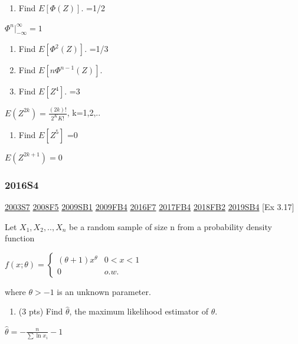 \documentclass[6pt,twocolumn,Portrait]{article}
\providecommand{\tightlist}{%
  \setlength{\itemsep}{0pt}\setlength{\parskip}{0pt}}
\begin{document}
\begin{enumerate}
\def\labelenumi{(\alph{enumi})}
\tightlist
\item
  Find \(E[\Phi(Z)]\). =1/2
\end{enumerate}

\(\Phi^n |_{-\infty}^{\infty}=1\)

\begin{enumerate}
\def\labelenumi{(\alph{enumi})}
\setcounter{enumi}{1}
\item
  Find \(E[\Phi^{2}(Z)]\). =1/3
\item
  Find \(E[n\Phi^{n-1}(Z)]\).
\item
  Find \(E[Z^4]\). =3
\end{enumerate}

\(E(Z^{2k})=\frac{(2k)!}{2^KK!}\), k=1,2,..

\begin{enumerate}
\def\labelenumi{(\alph{enumi})}
\setcounter{enumi}{4}
\tightlist
\item
  Find \(E[Z^5]\) =0
\end{enumerate}

\(E(Z^{2k+1})=0\)

\hypertarget{s4-4}{%
\subsubsection{2016S4}\label{s4-4}}

\protect\hyperlink{s7}{2003S7} \protect\hyperlink{f5-3}{2008F5}
\protect\hyperlink{sb1}{2009SB1} \protect\hyperlink{fb4}{2009FB4}
\protect\hyperlink{f7-5}{2016F7} \protect\hyperlink{fb4-3}{2017FB4}
\protect\hyperlink{fb2-4}{2018FB2} \protect\hyperlink{sb4-2}{2019SB4}
{[}Ex 3.17{]}

Let \(X_1,X_2,..,X_n\) be a random sample of size n from a probability
density function

\(f(x;\theta)=\begin{cases}(\theta+1)x^\theta& 0<x<1\\0& o.w.\end{cases}\)

where \(\theta>-1\) is an unknown parameter.

\begin{enumerate}
\def\labelenumi{(\alph{enumi})}
\tightlist
\item
  (3 pts) Find \(\hat\theta\), the maximum likelihood estimator of
  \(\theta\).
\end{enumerate}

\(\hat\theta=-\frac{n}{\sum\ln x_i}-1\)
\end{document}
